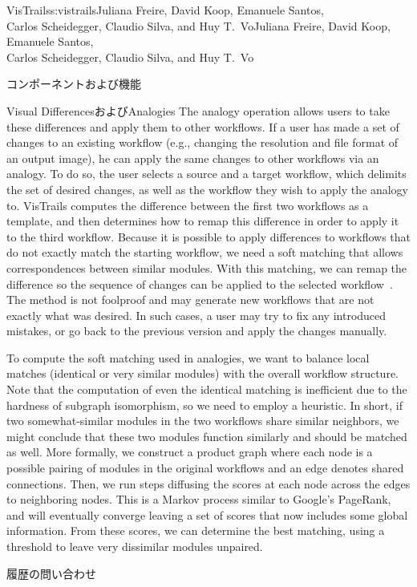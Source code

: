 \begin{aosachaptertoc}{VisTrails}{s:vistrails}{Juliana Freire, David Koop, Emanuele Santos, \\ Carlos Scheidegger, Claudio Silva, and Huy T.\ Vo}{Juliana Freire, David Koop, Emanuele Santos, \\ \hspace*{0.9cm} Carlos Scheidegger, Claudio Silva, and Huy T.\ Vo}
\begin{aosasect1}{コンポーネントおよび機能}
\begin{aosasect2}{Visual DifferencesおよびAnalogies}
The analogy operation allows users to take these differences and apply
them to other workflows.  If a user has made a set of changes to an
existing workflow (e.g., changing the resolution and file format of an
output image), he can apply the same changes to other workflows via an
analogy.  To do so, the user selects a source and a target workflow,
which delimits the set of desired changes, as well as the workflow
they wish to apply the analogy to.  VisTrails computes the difference
between the first two workflows as a template, and then determines 
how to remap this difference in order to apply it to the third
workflow.  Because it is possible to apply differences to workflows
that do not exactly match the starting workflow, we need a soft
matching that allows correspondences between similar modules.  With
this matching, we can remap the difference so the sequence of changes
can be applied to the selected
workflow~\cite{bib:scheidegger:analogy}.  The method is not foolproof
and may generate new workflows that are not exactly what was desired.
In such cases, a user may try to fix any introduced mistakes, or go
back to the previous version and apply the changes manually.

To compute the soft matching used in analogies, we want to balance
local matches (identical or very similar modules) with the overall
workflow structure.  Note that the computation of even the identical
matching is inefficient due to the hardness of subgraph isomorphism,
so we need to employ a heuristic.  In short, if two somewhat-similar
modules in the two workflows share similar neighbors, we might
conclude that these two modules function similarly and should be
matched as well.  More formally, we construct a product graph where
each node is a possible pairing of modules in the original workflows
and an edge denotes shared connections.  Then, we run steps diffusing
the scores at each node across the edges to neighboring nodes.  This
is a Markov process similar to Google's PageRank, and will eventually
converge leaving a set of scores that now includes some global
information.  From these scores, we can determine the best matching,
using a threshold to leave very dissimilar modules unpaired.

\end{aosasect2}

\begin{aosasect2}{履歴の問い合わせ}


\end{aosasect2}
\end{aosasect1}
\end{aosachaptertoc}
